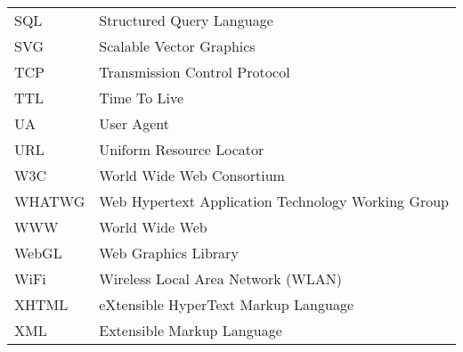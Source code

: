\begin{longtable}{@{}p{}p{}@{}}
SQL & Structured Query Language\\
SVG & Scalable Vector Graphics\\
TCP & Transmission Control Protocol\\
TTL & Time To Live\\
UA & User Agent\\
URL & Uniform Resource Locator\\
W3C & World Wide Web Consortium\\
WHATWG & Web Hypertext Application Technology Working Group\\
WWW &  World Wide Web\\
WebGL & Web Graphics Library\\
WiFi & Wireless Local Area Network (WLAN)\\
XHTML & eXtensible HyperText Markup Language\\
XML & Extensible Markup Language\\

\end{longtable}
